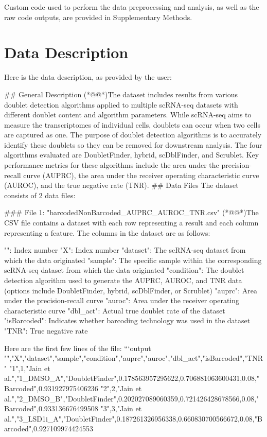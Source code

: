 \documentclass[11pt]{article}
\begin{document}
Custom code used to perform the data preprocessing and analysis, as well as the raw code outputs, are provided in Supplementary Methods.






\clearpage
\appendix

\section{Data Description} \label{sec:data_description} Here is the data description, as provided by the user:

\begin{codeoutput}
\#\# General Description
(*@@*)The dataset includes results from various doublet detection algorithms applied to multiple scRNA-seq datasets with different doublet content and algorithm parameters. While scRNA-seq aims to measure the transcriptomes of individual cells, doublets can occur when two cells are captured as one. The purpose of doublet detection algorithms is to accurately identify these doublets so they can be removed for downstream analysis. The four algorithms evaluated are DoubletFinder, hybrid, scDblFinder, and Scrublet. Key performance metrics for these algorithms include the area under the precision-recall curve (AUPRC), the area under the receiver operating characteristic curve (AUROC), and the true negative rate (TNR).
\#\# Data Files
The dataset consists of 2 data files:

\#\#\# File 1: "barcodedNonBarcoded\_AUPRC\_AUROC\_TNR.csv"
(*@@*)The CSV file contains a dataset with each row representing a result and each column representing a feature. The columns in the dataset are as follows:

"": Index number
"X": Index number
"dataset": The scRNA-seq dataset from which the data originated
"sample": The specific sample within the corresponding scRNA-seq dataset from which the data originated
"condition": The doublet detection algorithm used to generate the AUPRC, AUROC, and TNR data (options include DoubletFinder, hybrid, scDblFinder, or Scrublet)
"auprc": Area under the precision-recall curve
"auroc": Area under the receiver operating characteristic curve
"dbl\_act": Actual true doublet rate of the dataset
"isBarcoded": Indicates whether barcoding technology was used in the dataset
"TNR": True negative rate


Here are the first few lines of the file:
```output
"","X","dataset","sample","condition","auprc","auroc","dbl\_act","isBarcoded","TNR"
"1",1,"Jain et al.","1\_DMSO\_A","DoubletFinder",0.178563957295622,0.706881063600431,0.08,"Barcoded",0.931927975406236
"2",2,"Jain et al.","2\_DMSO\_B","DoubletFinder",0.202027089060359,0.721426428678566,0.08,"Barcoded",0.933136676499508
"3",3,"Jain et al.","3\_LSD1i\_A","DoubletFinder",0.187261326956338,0.660830700566672,0.08,"Barcoded",0.927109974424553


\end{codeoutput}
\end{document}
